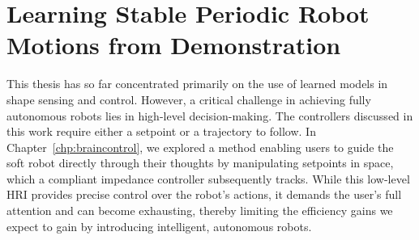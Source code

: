 \chapter{Learning Stable Periodic Robot Motions from Demonstration}
\label{chp:osmp}

\begin{foreword}
    This thesis has so far concentrated primarily on the use of learned models in shape sensing and control. However, a critical challenge in achieving fully autonomous robots lies in high-level decision-making. The controllers discussed in this work require either a setpoint or a trajectory to follow. In Chapter~\ref{chp:braincontrol}, we explored a method enabling users to guide the soft robot directly through their thoughts by manipulating setpoints in space, which a compliant impedance controller subsequently tracks. While this low-level \gls{HRI} provides precise control over the robot’s actions, it demands the user’s full attention and can become exhausting, thereby limiting the efficiency gains we expect to gain by introducing intelligent, autonomous robots.

\end{foreword}
